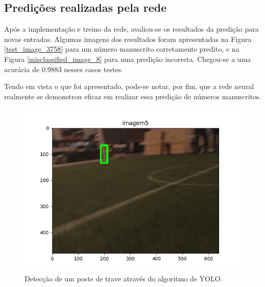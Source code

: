 \documentclass[conference]{IEEEtran}
\begin{document}
\subsection{Predições realizadas pela rede}
Após a implementação e treino da rede, avaliou-se os resultados da predição para novas entradas. Algumas imagens dos resultados foram apresentadas na Figura \ref{test_image_3758} para um número manuscrito corretamente predito, e na Figura \ref{misclassified_image_8} para uma predição incorreta. Chegou-se a uma acurácia de 0.9883 nesses casos testes.

Tendo em vista o que foi apresentado, pode-se notar, por fim, que a rede neural realmente se demonstrou eficaz em realizar essa predição de números manuscritos.

\begin{figure}[htbp]
\centering
\centerline{\includegraphics[scale=0.5]{imagens/imagem5_detection.png}}
\caption{Detecção de um poste de trave através do algoritmo de YOLO.}
\label{imagem5_detection}
\end{figure}

\end{document}
